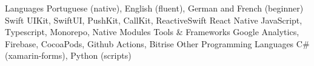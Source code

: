 \begin{cvskills}
  \cvskill
    {Languages}
    {Portuguese (native), English (fluent), German and French (beginner)}
  \cvskill
    {Swift}
    {UIKit, SwiftUI, PushKit, CallKit, ReactiveSwift}
    \cvskill
    {React Native}
    {JavaScript, Typescript, Monorepo, Native Modules}
   \cvskill
    {Tools \& Frameworks}
    {Google Analytics, Firebase, CocoaPods, Github Actions, Bitrise}
   \cvskill
     {Other Programming Languages}
     {C\# (xamarin-forms), Python (scripts) }
\end{cvskills}

